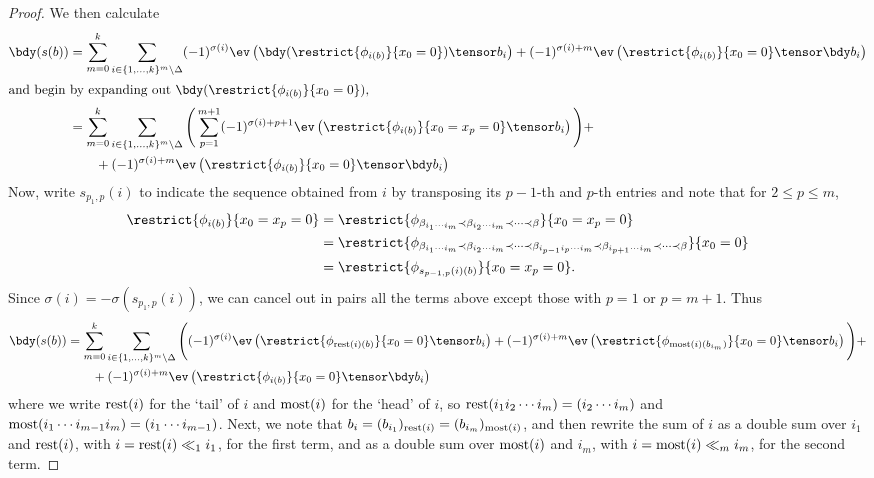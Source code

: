 \begin{proof}
We then calculate
\begin{align*}
\bdy(s(b)) & = \sum_{m=0}^{k} \sum_{i \in \{1, \ldots, k\}^{m} \setminus \Delta} (-1)^{\sigma(i)} \ev\left(\bdy(\restrict{\phi_{i(b)}}{x_0 = 0})\tensor b_i\right) + (-1)^{\sigma(i) + m} \ev\left(\restrict{\phi_{i(b)}}{x_0 = 0} \tensor \bdy b_i\right) \\
\intertext{and begin by expanding out $\bdy(\restrict{\phi_{i(b)}}{x_0 = 0})$,}
	& = \sum_{m=0}^{k} \sum_{i \in \{1, \ldots, k\}^{m} \setminus \Delta} \Bigg(\sum_{p=1}^{m+1} (-1)^{\sigma(i)+p+1} \ev\left(\restrict{\phi_{i(b)}}{x_0 = x_p = 0}\tensor b_i\right) \Bigg) + \\
	& \qquad + (-1)^{\sigma(i) + m} \ev\left(\restrict{\phi_{i(b)}}{x_0 = 0} \tensor \bdy b_i\right)
\end{align*}
Now, write $s_{p_1,p}(i)$ to indicate the sequence obtained from $i$ by transposing its $p-1$-th and $p$-th entries and note that for $2 \leq p \leq m$,
\begin{align*}
\restrict{\phi_{i(b)}}{x_0=x_p=0} & = \restrict{\phi_{\beta_{i_1\cdots i_m} \prec \beta_{i_2 \cdots i_m} \prec \cdots \prec \beta}}{x_0=x_p=0} \\
	& = \restrict{\phi_{\beta_{i_1\cdots i_m} \prec \beta_{i_2 \cdots i_m} \prec \cdots \prec \beta_{i_{p-1} i_p \cdots i_m} \prec \beta_{i_{p+1} \cdots i_m} \prec \cdots \prec \beta}}{x_0=0} \\
	& = \restrict{\phi_{s_{p-1,p}(i)(b)}}{x_0=x_p=0}.
\end{align*}
Since $\sigma(i) = - \sigma(s_{p_1,p}(i))$, we can cancel out in pairs all the terms above except those with $p=1$ or $p=m+1$. Thus
\begin{align*}
\bdy(s(b)) & = \sum_{m=0}^{k} \sum_{i \in \{1, \ldots, k\}^{m} \setminus \Delta} \Bigg((-1)^{\sigma(i)} \ev\left(\restrict{\phi_{\rest(i)(b)}}{x_0 = 0}\tensor b_i\right) + (-1)^{\sigma(i) + m} \ev\left(\restrict{\phi_{\most(i)(b_{i_m})}}{x_0 = 0}\tensor b_i\right)\Bigg) + \\
	& \qquad + (-1)^{\sigma(i) + m} \ev\left(\restrict{\phi_{i(b)}}{x_0 = 0} \tensor \bdy b_i\right)
\end{align*}
where we write $\operatorname{rest}(i)$ for the `tail' of $i$ and $\operatorname{most}(i)$ for the `head' of $i$, so $\operatorname{rest}(i_1 i_2 \cdots i_m) = (i_2 \cdots i_m)$ and $\operatorname{most}(i_1 \cdots i_{m-1} i_m) = (i_1 \cdots i_{m-1})$. Next, we note that $b_i = (b_{i_1})_{\operatorname{rest}(i)} = (b_{i_m})_{\operatorname{most}(i)}$, and then rewrite the sum of $i$ as a double sum over $i_1$ and $\operatorname{rest}(i)$, with $i = \operatorname{rest}(i) \ll_1 i_1$, for the first term, and as a double sum over $\operatorname{most}(i)$ and $i_m$, with $i = \operatorname{most}(i) \ll_{m} i_m$, for the second term.

\end{proof}
